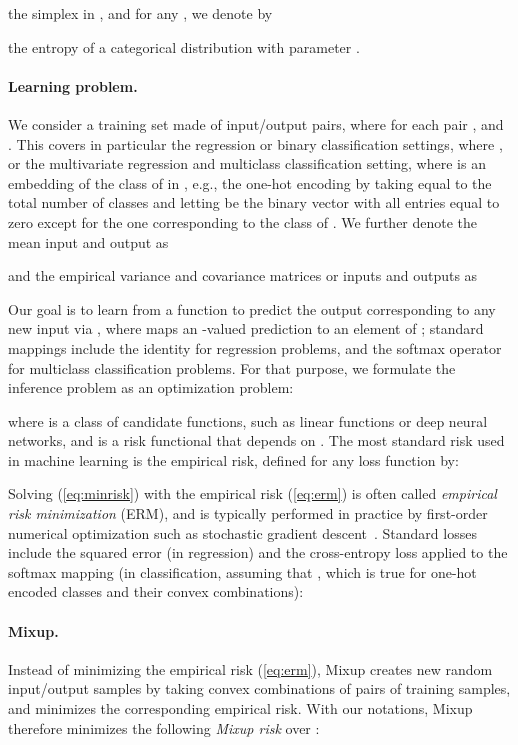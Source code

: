 \documentclass[twoside,11pt]{article}
\newcommand{\rev}[1]{{#1}}
\begin{document}
the simplex in , and for any , we denote by

the entropy of a categorical distribution with parameter .

\paragraph{Learning problem.}
We consider a training set  made of  input/output pairs, where for each pair ,  and . This covers in particular the regression or binary classification settings, where , or the multivariate regression and multiclass classification setting, where  is an embedding of the class of  in , e.g., the one-hot encoding by taking  equal to the total number of classes and letting  be the binary vector with all entries equal to zero except for the one corresponding to the class of . We further denote the mean input and output as

and the empirical variance and covariance matrices 
or inputs and outputs as

Our goal is to learn from  a function \rev{} to predict the output corresponding to any new input  via \rev{, where  maps an -valued prediction to an element of ; standard mappings include the identity  for regression problems, and the softmax operator  for multiclass classification problems}. For that purpose, we formulate the inference problem as an optimization problem:

where  is a class of candidate functions, such as linear functions or deep neural networks, and  is a risk functional that depends on . The most standard risk used in machine learning is the empirical risk, defined for any loss function \rev{} by:

Solving (\ref{eq:minrisk}) with the empirical risk (\ref{eq:erm}) is often called \emph{empirical risk minimization} (ERM), and is typically performed in practice by first-order numerical optimization such as stochastic gradient descent~\citep{Bottou2008Tradeoffs}. Standard losses  include the squared error (in regression) and the cross-entropy loss \rev{applied to the softmax mapping} (in classification, assuming that , which is true for one-hot encoded classes and their convex combinations):


\paragraph{Mixup.}
Instead of minimizing the empirical risk (\ref{eq:erm}),  Mixup \citep{Zhang2018mixup}  creates new random input/output samples by taking convex combinations of pairs of training samples, and minimizes the corresponding empirical risk. With our notations, Mixup therefore minimizes the following \emph{Mixup risk} over :
\end{document}
